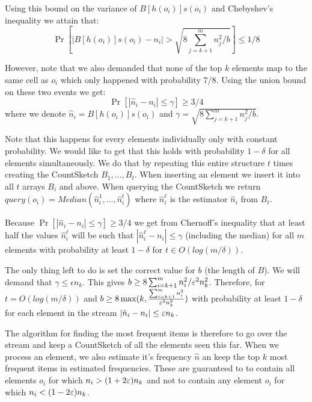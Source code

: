 Using this bound on the variance of $B[h(o_i)]s(o_i)$ and Chebyshev's inequality we attain that:
$$
\Pr\left[ \left| B[h(o_i)]s(o_i) - n_i \right| > \sqrt{8 \sum_{j = k+1}^{m}n^2_j / b} \right] \le 1/8
$$

However, note that we also demanded that none of the top $k$ elements map to the same cell as $o_i$
which only happened with probability $7/8$. Using the union bound on these two events we get:   
$$
\Pr\left[ \left| \hat{n}_i - n_i \right| \le \gamma \right] \ge 3/4
$$
where we denote $\hat{n}_i =  B[h(o_i)]s(o_i)$ and $\gamma = \sqrt{8 \sum_{j = k+1}^{m}n^2_j / b}$.

Note that this happens for every elements individually only with constant probability.
We would like to get that this holds with probability $1-\delta$ for all elements simultaneously.
We do that by repeating this entire structure $t$ times creating the CountSketch $B_1,\ldots,B_t$.
When inserting an element we insert it into all $t$ arrays $B_i$ and above. 
When querying the CountSketch we return $query(o_i) = Median(\hat{n}^1_i,\ldots,\hat{n}^t_i)$ where $\hat{n}^\ell_i$
is the estimator $\hat{n}_i$ from $B_\ell$. 

Because $\Pr\left[ \left| \hat{n}_i - n_i \right| \le \gamma \right] \ge 3/4$ we get from Chernoff's inequality that
at least half the values $\hat{n}^\ell_i$ will be such that $\left| \hat{n}^\ell_i - n_i \right| \le \gamma$ (including the median)
for all $m$ elements with probability at least $1-\delta$ for $t \in O(log(m/\delta))$.

The only thing left to do is set the correct value for $b$ (the length of $B$).
We will demand that $\gamma \le \epsilon n_k$. This gives $b \ge 8\sum_{i=k+1}^{m}n^2_i/\varepsilon^2 n_k^2$.
Therefore, for $t = O(log(m/\delta))$ and $b \ge 8\max(k,\frac{\sum_{i=k+1}^{m}n^2_i}{\varepsilon^2 n_k^2})$
with probability at least $1-\delta$ for each element in the stream $|\hat{n}_i - n_i| \le \varepsilon n_k$.



The algorithm for finding the most frequent items is therefore to go over the stream and keep a CountSketch 
of all the elements seen this far. When we process an element, we also estimate it's frequency $\hat{n}$ an keep the top $k$
most frequent items in estimated frequencies. These are guaranteed to to contain all elements $o_i$ for which $n_i > (1+2\varepsilon)n_k$
and not to contain any element  $o_i$ for which $n_i < (1-2\varepsilon)n_k$.

